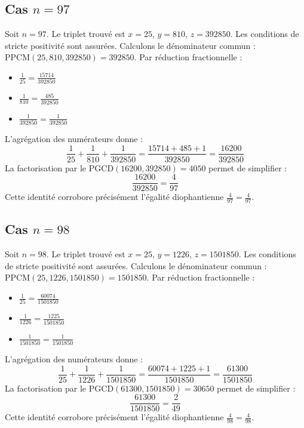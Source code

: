 \documentclass[11pt,a4paper]{article}
\begin{document}
\subsection{Cas $n = 97$}
Soit $n = 97$. Le triplet trouvé est $x = 25$, $y = 810$, $z = 392850$.
Les conditions de stricte positivité sont assurées.
Calculons le dénominateur commun : $\text{PPCM}(25, 810, 392850) = 392850$.
Par réduction fractionnelle :
\begin{itemize}
    \item $\frac{1}{25} = \frac{15714}{392850}$
    \item $\frac{1}{810} = \frac{485}{392850}$
    \item $\frac{1}{392850} = \frac{1}{392850}$
\end{itemize}
L'agrégation des numérateurs donne :
$$ \frac{1}{25} + \frac{1}{810} + \frac{1}{392850} = \frac{15714 + 485 + 1}{392850} = \frac{16200}{392850} $$
La factorisation par le $\text{PGCD}(16200, 392850) = 4050$ permet de simplifier :
$$ \frac{16200}{392850} = \frac{4}{97} $$
Cette identité corrobore précisément l'égalité diophantienne $\frac{4}{97} = \frac{4}{97}$.

\subsection{Cas $n = 98$}
Soit $n = 98$. Le triplet trouvé est $x = 25$, $y = 1226$, $z = 1501850$.
Les conditions de stricte positivité sont assurées.
Calculons le dénominateur commun : $\text{PPCM}(25, 1226, 1501850) = 1501850$.
Par réduction fractionnelle :
\begin{itemize}
    \item $\frac{1}{25} = \frac{60074}{1501850}$
    \item $\frac{1}{1226} = \frac{1225}{1501850}$
    \item $\frac{1}{1501850} = \frac{1}{1501850}$
\end{itemize}
L'agrégation des numérateurs donne :
$$ \frac{1}{25} + \frac{1}{1226} + \frac{1}{1501850} = \frac{60074 + 1225 + 1}{1501850} = \frac{61300}{1501850} $$
La factorisation par le $\text{PGCD}(61300, 1501850) = 30650$ permet de simplifier :
$$ \frac{61300}{1501850} = \frac{2}{49} $$
Cette identité corrobore précisément l'égalité diophantienne $\frac{4}{98} = \frac{4}{98}$.
\end{document}
